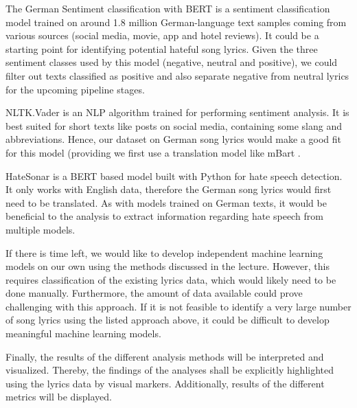 The German Sentiment classification with BERT \cite{guhr2020training} is a sentiment classification model trained on around 1.8 million German-language text samples coming from various sources (social media, movie, app and hotel reviews). It could be a starting point for identifying potential hateful song lyrics. Given the three sentiment classes used by this model (negative, neutral and positive), we could filter out texts classified as positive and also separate negative from neutral lyrics for the upcoming pipeline stages.

NLTK.Vader \cite{vader} is an NLP algorithm trained for performing sentiment analysis. It is best suited for short texts like posts on social media, containing some slang and abbreviations. Hence, our dataset on German song lyrics would make a good fit for this model (providing we first use a translation model like mBart \cite{mBart}.

HateSonar \cite{davidson2017automated} is a BERT based model built with Python for hate speech detection. It only works with English data, therefore the German song lyrics would first need to be translated. As with models trained on German texts, it would be beneficial to the analysis to extract information regarding hate speech from multiple models.  

If there is time left, we would like to develop independent machine learning models on our own using the methods discussed in the lecture. However, this requires classification of the existing lyrics data, which would likely need to be done manually. Furthermore, the amount of data available could prove challenging with this approach. If it is not feasible to identify a very large number of song lyrics using the listed approach above, it could be difficult to develop meaningful machine learning models.

Finally, the results of the different analysis methods will be interpreted and visualized. Thereby, the findings of the analyses shall be explicitly highlighted using the lyrics data by visual markers. Additionally, results of the different metrics will be displayed. 







  